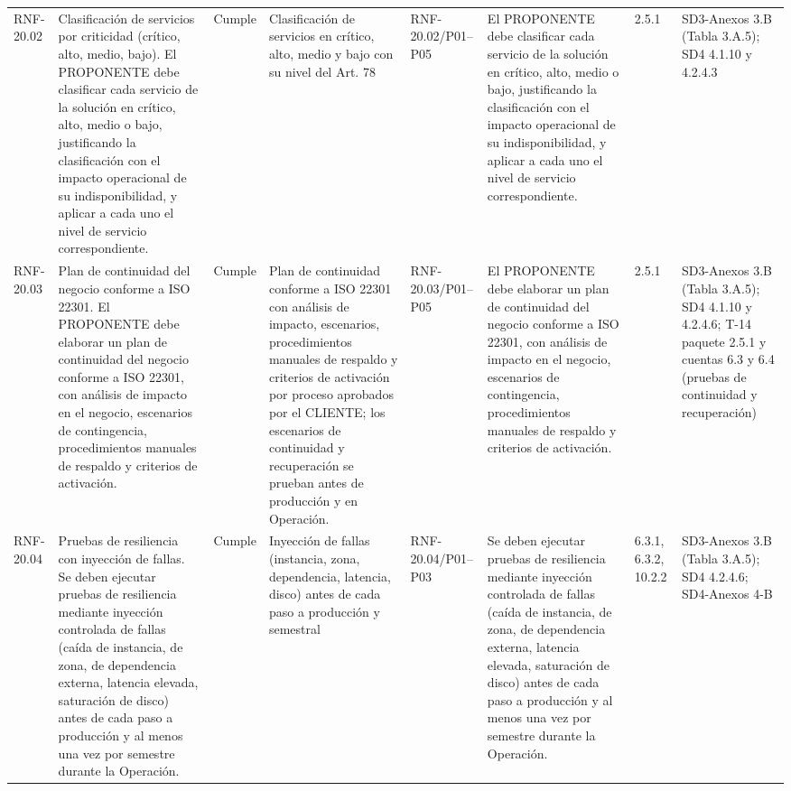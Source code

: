 \documentclass[oficio,firma,final]{lafrox}
\begin{document}
\begin{landscape}
{\begin{longtable}{@{}F{0.054} F{0.173} F{0.061} F{0.191} F{0.106} F{0.180} F{0.067} F{0.168}@{}}
  RNF-20.02 & Clasificación de servicios por criticidad (crítico, alto, medio, bajo). El PROPONENTE debe clasificar cada servicio de la solución en crítico, alto, medio o bajo, justificando la clasificación con el impacto operacional de su indisponibilidad, y aplicar a cada uno el nivel de servicio correspondiente. & Cumple & Clasificación de servicios en crítico, alto, medio y bajo con su nivel del Art. 78 & RNF-20.02/\allowbreak{}P01--\allowbreak{}P05 & El PROPONENTE debe clasificar cada servicio de la solución en crítico, alto, medio o bajo, justificando la clasificación con el impacto operacional de su indisponibilidad, y aplicar a cada uno el nivel de servicio correspondiente. & 2.5.1 & SD3-Anexos 3.B (Tabla 3.A.5); SD4 4.1.10 y 4.2.4.3  \\
  RNF-20.03 & Plan de continuidad del negocio conforme a ISO 22301. El PROPONENTE debe elaborar un plan de continuidad del negocio conforme a ISO 22301, con análisis de impacto en el negocio, escenarios de contingencia, procedimientos manuales de respaldo y criterios de activación. & Cumple & Plan de continuidad conforme a ISO 22301 con análisis de impacto, escenarios, procedimientos manuales de respaldo y criterios de activación por proceso aprobados por el CLIENTE; los escenarios de continuidad y recuperación se prueban antes de producción y en Operación. & RNF-20.03/\allowbreak{}P01--\allowbreak{}P05 & El PROPONENTE debe elaborar un plan de continuidad del negocio conforme a ISO 22301, con análisis de impacto en el negocio, escenarios de contingencia, procedimientos manuales de respaldo y criterios de activación. & 2.5.1 & SD3-Anexos 3.B (Tabla 3.A.5); SD4 4.1.10 y 4.2.4.6; T-14 paquete 2.5.1 y cuentas 6.3 y 6.4 (pruebas de continuidad y recuperación)  \\
  RNF-20.04 & Pruebas de resiliencia con inyección de fallas. Se deben ejecutar pruebas de resiliencia mediante inyección controlada de fallas (caída de instancia, de zona, de dependencia externa, latencia elevada, saturación de disco) antes de cada paso a producción y al menos una vez por semestre durante la Operación. & Cumple & Inyección de fallas (instancia, zona, dependencia, latencia, disco) antes de cada paso a producción y semestral & RNF-20.04/\allowbreak{}P01--\allowbreak{}P03 & Se deben ejecutar pruebas de resiliencia mediante inyección controlada de fallas (caída de instancia, de zona, de dependencia externa, latencia elevada, saturación de disco) antes de cada paso a producción y al menos una vez por semestre durante la Operación. & 6.3.1, 6.3.2, 10.2.2 & SD3-Anexos 3.B (Tabla 3.A.5); SD4 4.2.4.6; SD4-Anexos 4-B  \\

\end{longtable}}
\end{landscape}
\end{document}
